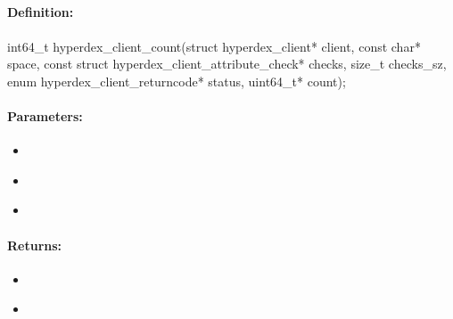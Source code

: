 \pagebreak
\subsection{}
\label{api:c:count}


\paragraph{Definition:}
\begin{ccode}
int64_t hyperdex_client_count(struct hyperdex_client* client,
        const char* space,
        const struct hyperdex_client_attribute_check* checks, size_t checks_sz,
        enum hyperdex_client_returncode* status,
        uint64_t* count);
\end{ccode}

\paragraph{Parameters:}
\begin{itemize}[noitemsep]
\item {}\\

\item {}\\

\item {}\\

\end{itemize}

\paragraph{Returns:}
\begin{itemize}[noitemsep]
\item {}\\

\item {}\\

\end{itemize}
